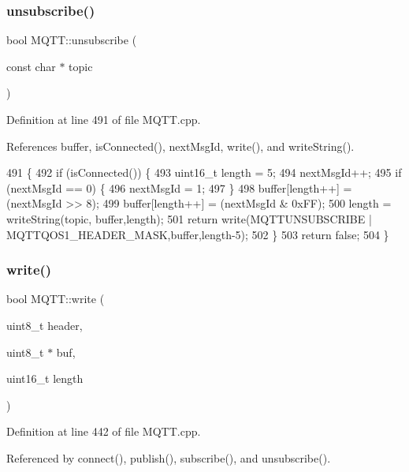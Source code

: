 \subsubsection{unsubscribe()}
{\footnotesize\ttfamily bool M\+Q\+T\+T\+::unsubscribe (\begin{DoxyParamCaption}\item[{const char $\ast$}]{topic }\end{DoxyParamCaption})}



Definition at line 491 of file M\+Q\+T\+T.\+cpp.



References buffer, is\+Connected(), next\+Msg\+Id, write(), and write\+String().


\begin{DoxyCode}
491                                         \{
492     \textcolor{keywordflow}{if} (isConnected()) \{
493         uint16\_t length = 5;
494         nextMsgId++;
495         \textcolor{keywordflow}{if} (nextMsgId == 0) \{
496             nextMsgId = 1;
497         \}
498         buffer[length++] = (nextMsgId >> 8);
499         buffer[length++] = (nextMsgId & 0xFF);
500         length = writeString(topic, buffer,length);
501         \textcolor{keywordflow}{return} write(MQTTUNSUBSCRIBE | MQTTQOS1_HEADER_MASK,buffer,length-5);
502     \}
503     \textcolor{keywordflow}{return} \textcolor{keyword}{false};
504 \}
\end{DoxyCode}
\mbox{\label{class_m_q_t_t_a19b7d1a9fae7e5176469c167a6919060}} 
\subsubsection{write()}
{\footnotesize\ttfamily bool M\+Q\+T\+T\+::write (\begin{DoxyParamCaption}\item[{uint8\+\_\+t}]{header,  }\item[{uint8\+\_\+t $\ast$}]{buf,  }\item[{uint16\+\_\+t}]{length }\end{DoxyParamCaption})\hspace{0.3cm}{\ttfamily [private]}}



Definition at line 442 of file M\+Q\+T\+T.\+cpp.



Referenced by connect(), publish(), subscribe(), and unsubscribe().


